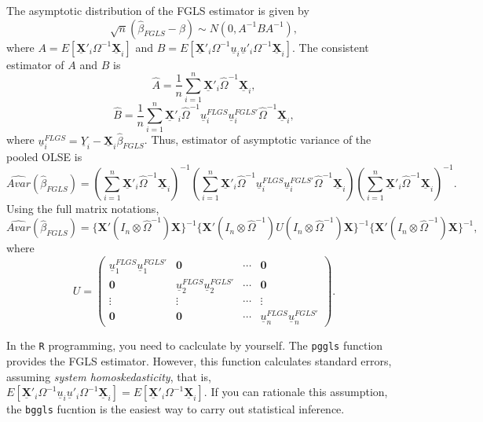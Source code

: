 \documentclass[
  12pt,
]{article}
\begin{document}
The asymptotic distribution of the FGLS estimator is given by \[
  \sqrt{n}(\hat{\beta}_{FGLS} - \beta) \sim N(0, A^{-1} B A^{-1}),
\] where
\(A = E[\underline{\mathbf{X}}'_i \Omega^{-1} \underline{\mathbf{X}}_i]\)
and
\(B = E[\underline{\mathbf{X}}'_i \Omega^{-1} \underline{u}_i \underline{u}'_i \Omega^{-1} \underline{\mathbf{X}}_i]\).
The consistent estimator of \(A\) and \(B\) is \[
  \hat{A} = \frac{1}{n} \sum_{i=1}^n \underline{\mathbf{X}}'_i \hat{\Omega}^{-1} \underline{\mathbf{X}}_i,
\] \[
  \hat{B} 
  = \frac{1}{n} \sum_{i=1}^n
  \underline{\mathbf{X}}'_i \hat{\Omega}^{-1} 
  \underline{u}^{FLGS}_i \underline{u}^{FGLS'}_i 
  \hat{\Omega}^{-1} \underline{\mathbf{X}}_i,
\] where
\(\underline{u}^{FLGS}_i = \underline{Y}_i - \underline{\mathbf{X}}_i \hat{\beta}_{FGLS}\).
Thus, estimator of asymptotic variance of the pooled OLSE is \[
  \hat{Avar}(\hat{\beta}_{FGLS}) =
  \left( \sum_{i=1}^n \underline{\mathbf{X}}'_i \hat{\Omega}^{-1} \underline{\mathbf{X}}_i \right)^{-1}
  \left( \sum_{i=1}^n \underline{\mathbf{X}}'_i \hat{\Omega}^{-1} 
  \underline{u}^{FLGS}_i \underline{u}^{FGLS'}_i 
  \hat{\Omega}^{-1} \underline{\mathbf{X}}_i \right)
  \left( \sum_{i=1}^n \underline{\mathbf{X}}'_i \hat{\Omega}^{-1} \underline{\mathbf{X}}_i \right)^{-1}.
\] Using the full matrix notations, \[
  \hat{Avar}(\hat{\beta}_{FGLS}) =
  \{ \mathbf{X}'(I_n \otimes \hat{\Omega}^{-1}) \mathbf{X} \}^{-1}
  \{ \mathbf{X}'(I_n \otimes \hat{\Omega}^{-1}) U (I_n \otimes \hat{\Omega}^{-1}) \mathbf{X} \}^{-1}
  \{ \mathbf{X}'(I_n \otimes \hat{\Omega}^{-1}) \mathbf{X} \}^{-1},
\] where \[
  U = 
  \begin{pmatrix}
    \underline{u}^{FLGS}_1 \underline{u}^{FGLS'}_1 & \mathbf{0} & \cdots & \mathbf{0} \\
    \mathbf{0} & \underline{u}^{FLGS}_2 \underline{u}^{FGLS'}_2 & \cdots & \mathbf{0} \\
    \vdots & \vdots & \cdots & \vdots \\
    \mathbf{0} & \mathbf{0} & \cdots & \underline{u}^{FLGS}_n \underline{u}^{FGLS'}_n
  \end{pmatrix}.
\]

In the \texttt{R} programming, you need to caclculate by yourself. The
\texttt{pggls} function provides the FGLS estimator. However, this
function calculates standard errors, assuming \emph{system
homoskedasticity}, that is,
\(E[\underline{\mathbf{X}}'_i \Omega^{-1} \underline{u}_i \underline{u}'_i \Omega^{-1} \underline{\mathbf{X}}_i] = E[\underline{\mathbf{X}}'_i \Omega^{-1} \underline{\mathbf{X}}_i]\).
If you can rationale this assumption, the \texttt{bggls} fucntion is the
easiest way to carry out statistical inference.
\end{document}
